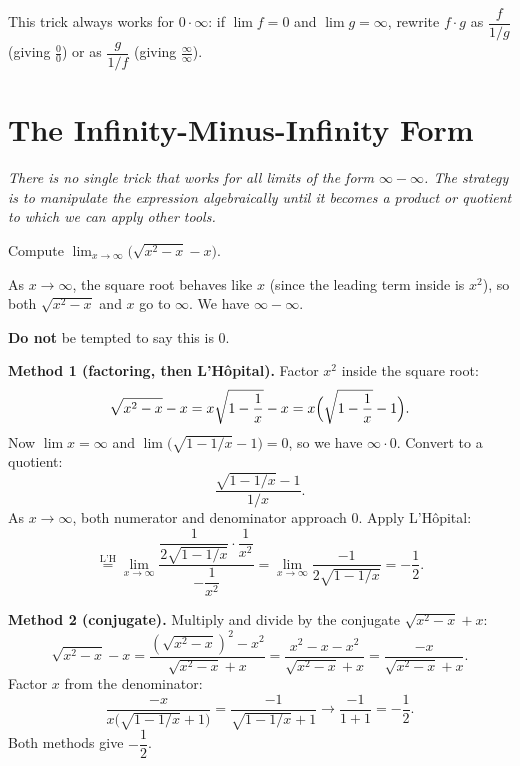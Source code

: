 \begin{remark}
This trick always works for $0 \cdot \infty$: if $\lim f = 0$ and $\lim g = \infty$, rewrite $f\cdot g$ as $\dfrac{f}{1/g}$ (giving $\frac{0}{0}$) or as $\dfrac{g}{1/f}$ (giving $\frac{\infty}{\infty}$).
\end{remark}

\section{The Infinity-Minus-Infinity Form}
\label{sec:6.10}

\textit{There is no single trick that works for all limits of the form $\infty - \infty$.  The strategy is to manipulate the expression algebraically until it becomes a product or quotient to which we can apply other tools.}

\begin{example}
\label{ex:6-11}
Compute $\displaystyle\lim_{x \to \infty}\bigl(\sqrt{x^{2} - x} - x\bigr)$.

As $x \to \infty$, the square root behaves like $x$ (since the leading term inside is $x^{2}$), so both $\sqrt{x^{2}-x}$ and $x$ go to $\infty$.  We have $\infty - \infty$.

\textbf{Do not} be tempted to say this is $0$.

\textbf{Method 1 (factoring, then L'H\^opital).}  Factor $x^{2}$ inside the square root:
\[
  \sqrt{x^{2}-x} - x = x\sqrt{1-\frac{1}{x}} - x = x\Bigl(\sqrt{1-\frac{1}{x}} - 1\Bigr).
\]
Now $\lim x = \infty$ and $\lim\bigl(\sqrt{1-1/x}-1\bigr) = 0$, so we have $\infty\cdot 0$.  Convert to a quotient:
\[
  \frac{\sqrt{1 - 1/x} - 1}{1/x}.
\]
As $x \to \infty$, both numerator and denominator approach $0$.  Apply L'H\^opital:
\[
  \stackrel{\text{L'H}}{=} \lim_{x \to \infty}\frac{\dfrac{1}{2\sqrt{1 - 1/x}}\cdot\dfrac{1}{x^{2}}}{-\dfrac{1}{x^{2}}} = \lim_{x \to \infty}\frac{-1}{2\sqrt{1 - 1/x}} = -\frac{1}{2}.
\]

\textbf{Method 2 (conjugate).}  Multiply and divide by the conjugate $\sqrt{x^{2}-x}+x$:
\[
  \sqrt{x^{2}-x} - x = \frac{(\sqrt{x^{2}-x})^{2} - x^{2}}{\sqrt{x^{2}-x}+x} = \frac{x^{2}-x-x^{2}}{\sqrt{x^{2}-x}+x} = \frac{-x}{\sqrt{x^{2}-x}+x}.
\]
Factor $x$ from the denominator:
\[
  \frac{-x}{x\bigl(\sqrt{1-1/x}+1\bigr)} = \frac{-1}{\sqrt{1-1/x}+1} \to \frac{-1}{1+1} = -\frac{1}{2}.
\]
Both methods give $-\dfrac{1}{2}$.
\end{example}

